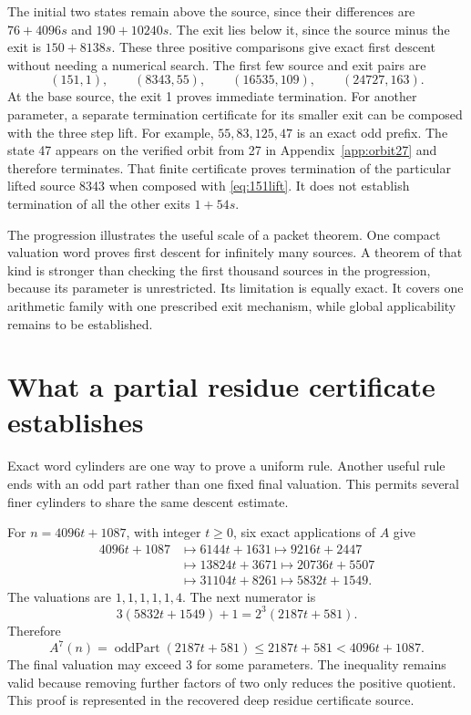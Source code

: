The initial two states remain above the source, since their differences are $76+4096s$ and $190+10240s$. The exit lies below it, since the source minus the exit is $150+8138s$. These three positive comparisons give exact first descent without needing a numerical search. The first few source and exit pairs are
\[
(151,1),\qquad(8343,55),\qquad(16535,109),\qquad(24727,163).
\]
At the base source, the exit 1 proves immediate termination. For another parameter, a separate termination certificate for its smaller exit can be composed with the three step lift. For example, $55,83,125,47$ is an exact odd prefix. The state 47 appears on the verified orbit from 27 in Appendix~\ref{app:orbit27} and therefore terminates. That finite certificate proves termination of the particular lifted source 8343 when composed with \eqref{eq:151lift}. It does not establish termination of all the other exits $1+54s$.

The progression illustrates the useful scale of a packet theorem. One compact valuation word proves first descent for infinitely many sources. A theorem of that kind is stronger than checking the first thousand sources in the progression, because its parameter is unrestricted. Its limitation is equally exact. It covers one arithmetic family with one prescribed exit mechanism, while global applicability remains to be established.

\section{What a partial residue certificate establishes}
Exact word cylinders are one way to prove a uniform rule. Another useful rule ends with an odd part rather than one fixed final valuation. This permits several finer cylinders to share the same descent estimate.

\begin{example}\label{ex:1087}
For $n=4096t+1087$, with integer $t\ge0$, six exact applications of $A$ give
\begin{align*}
4096t+1087&\longmapsto6144t+1631\longmapsto9216t+2447\\
&\longmapsto13824t+3671\longmapsto20736t+5507\\
&\longmapsto31104t+8261\longmapsto5832t+1549.
\end{align*}
The valuations are $1,1,1,1,1,4$. The next numerator is
\[
3(5832t+1549)+1=2^3(2187t+581).
\]
Therefore
\[
A^7(n)=\operatorname{oddPart}(2187t+581)
\le2187t+581<4096t+1087.
\]
The final valuation may exceed 3 for some parameters. The inequality remains valid because removing further factors of two only reduces the positive quotient. This proof is represented in the recovered deep residue certificate source.
\end{example}

